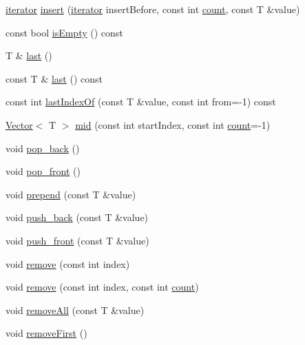 \begin{DoxyCompactItemize}
\hyperlink{classprism_1_1_vector_aa547779173a63f6f8c9b2887498d10eb}{iterator} \hyperlink{classprism_1_1_vector_abbbb5974eb963ef66153271a4b6adf52}{insert} (\hyperlink{classprism_1_1_vector_aa547779173a63f6f8c9b2887498d10eb}{iterator} insert\+Before, const int \hyperlink{classprism_1_1_vector_ad40e1dc908502680797f37312dda7a4f}{count}, const T \&value)
\item 
const bool \hyperlink{classprism_1_1_vector_a23be1fddbb4bc27cabd6af5d1aa4ba91}{is\+Empty} () const 
\item 
T \& \hyperlink{classprism_1_1_vector_aa03291f774fc83f46972b07672fc616c}{last} ()
\item 
const T \& \hyperlink{classprism_1_1_vector_a8298d925eeb3a3be9e68d874112daf8c}{last} () const 
\item 
const int \hyperlink{classprism_1_1_vector_a33e965cfc15bd23e0748dfacaeb97428}{last\+Index\+Of} (const T \&value, const int from=-\/1) const 
\item 
\hyperlink{classprism_1_1_vector}{Vector}$<$ T $>$ \hyperlink{classprism_1_1_vector_ad15f2817fe441c22bbbdb1e1ecfe9aed}{mid} (const int start\+Index, const int \hyperlink{classprism_1_1_vector_ad40e1dc908502680797f37312dda7a4f}{count}=-\/1)
\item 
void \hyperlink{classprism_1_1_vector_a990628b9b119ddcec57715cd7541ea99}{pop\+\_\+back} ()
\item 
void \hyperlink{classprism_1_1_vector_abd9320b7ae720bb4c3500ebba3e42537}{pop\+\_\+front} ()
\item 
void \hyperlink{classprism_1_1_vector_a1438597636b56d6c9f522e719097190c}{prepend} (const T \&value)
\item 
void \hyperlink{classprism_1_1_vector_a4a920a4960f25c0aef5461eb46a2620e}{push\+\_\+back} (const T \&value)
\item 
void \hyperlink{classprism_1_1_vector_ad1f9542ba64a36ffbd10ede7cae95aef}{push\+\_\+front} (const T \&value)
\item 
void \hyperlink{classprism_1_1_vector_a5a1f891782e1bb2cba1bbe89a9b8afc7}{remove} (const int index)
\item 
void \hyperlink{classprism_1_1_vector_a2b9dcf29eefe01b99a83ec5c2189b487}{remove} (const int index, const int \hyperlink{classprism_1_1_vector_ad40e1dc908502680797f37312dda7a4f}{count})
\item 
void \hyperlink{classprism_1_1_vector_a9f44c797424ce88caf23a50486846b9d}{remove\+All} (const T \&value)
\item 
void \hyperlink{classprism_1_1_vector_a3a2287f445b6788a38a746b448f98b48}{remove\+First} ()

\end{DoxyCompactItemize}
